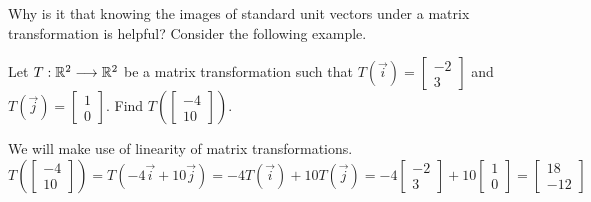 \documentclass{ximera}
\begin{document}
Why is it that knowing the images of standard unit vectors under a matrix transformation is helpful?  Consider the following example.

\begin{example}\label{ex:imageOfBasisVectors}
    Let $T:\mathbb{R}^2\longrightarrow\mathbb{R}^2$ be a matrix transformation such that  $T(\vec{i})=\begin{bmatrix}-2\\3\end{bmatrix}$ and $T(\vec{j})=\begin{bmatrix}1\\0\end{bmatrix}$.  Find $T\left(\begin{bmatrix}-4\\10\end{bmatrix}\right)$. 
    \begin{explanation}
        We will make use of linearity of matrix transformations.   $$T\left(\begin{bmatrix}-4\\10\end{bmatrix}\right)=T(-4\vec{i}+10\vec{j})=-4T(\vec{i})+10T(\vec{j})=-4\begin{bmatrix}-2\\3\end{bmatrix}+10\begin{bmatrix}1\\0\end{bmatrix}=\begin{bmatrix}18\\-12\end{bmatrix}$$
    \end{explanation}
\end{example}
\end{document}
